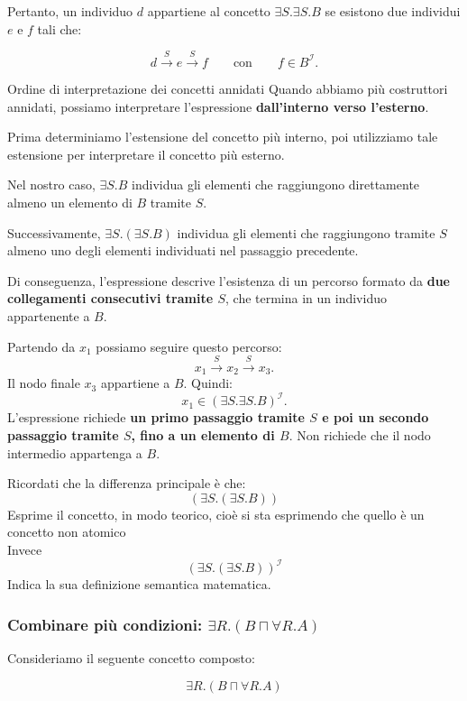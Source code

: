Pertanto, un individuo $d$ appartiene al concetto
$\exists S.\exists S.B$ se esistono due individui $e$ e $f$
tali che:

\[
d\xrightarrow{S}e\xrightarrow{S}f
\qquad\text{con}\qquad f\in B^{\mathcal I}.
\]

\begin{observation}{Ordine di interpretazione dei concetti annidati}
    Quando abbiamo più costruttori annidati,
    possiamo interpretare l'espressione
    \textbf{dall'interno verso l'esterno}.

    Prima determiniamo l'estensione del concetto
    più interno, poi utilizziamo tale estensione
    per interpretare il concetto più esterno.

    Nel nostro caso, $\exists S.B$ individua
    gli elementi che raggiungono direttamente
    almeno un elemento di $B$ tramite $S$.

    Successivamente, $\exists S.(\exists S.B)$
    individua gli elementi che raggiungono tramite $S$
    almeno uno degli elementi individuati
    nel passaggio precedente.

    Di conseguenza, l'espressione descrive
    l'esistenza di un percorso formato da
    \textbf{due collegamenti consecutivi tramite $S$},
    che termina in un individuo appartenente a $B$.
\end{observation}
Partendo da \(x_1\) possiamo seguire questo percorso:
\[
    x_1\xrightarrow{S}x_2\xrightarrow{S}x_3.
\]
Il nodo finale \(x_3\) appartiene a \(B\). Quindi:
\[
    x_1\in(\exists S.\exists S.B)^{\mathcal I}.
\]
L'espressione richiede \textbf{un primo passaggio tramite \(S\) e poi un
secondo passaggio tramite \(S\), fino a un elemento di \(B\)}. Non richiede
che il nodo intermedio appartenga a \(B\).

Ricordati che la differenza principale è che:
\[
(\exists S.(\exists S.B))
\]
Esprime il concetto, in modo teorico, cioè si sta esprimendo che quello è un concetto non atomico
\\
Invece
\[
(\exists S.(\exists S.B))^{\mathcal I}
\]
Indica la sua definizione semantica matematica.


\subsubsection{Combinare più condizioni: \(\exists R.(B\sqcap\forall R.A)\)}

Consideriamo il seguente concetto composto:

\[
\exists R.(B\sqcap\forall R.A)
\]

